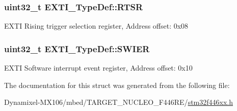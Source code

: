 \subsubsection[{\texorpdfstring{R\+T\+SR}{RTSR}}]{ uint32\+\_\+t E\+X\+T\+I\+\_\+\+Type\+Def\+::\+R\+T\+SR}\hypertarget{struct_e_x_t_i___type_def_ac019d211d8c880b327a1b90a06cc0675}{}\label{struct_e_x_t_i___type_def_ac019d211d8c880b327a1b90a06cc0675}
E\+X\+TI Rising trigger selection register, Address offset\+: 0x08 
\subsubsection[{\texorpdfstring{S\+W\+I\+ER}{SWIER}}]{ uint32\+\_\+t E\+X\+T\+I\+\_\+\+Type\+Def\+::\+S\+W\+I\+ER}\hypertarget{struct_e_x_t_i___type_def_a5c1f538e64ee90918cd158b808f5d4de}{}\label{struct_e_x_t_i___type_def_a5c1f538e64ee90918cd158b808f5d4de}
E\+X\+TI Software interrupt event register, Address offset\+: 0x10 

The documentation for this struct was generated from the following file\+:\begin{DoxyCompactItemize}
\item 
Dynamixel-\/\+M\+X106/mbed/\+T\+A\+R\+G\+E\+T\+\_\+\+N\+U\+C\+L\+E\+O\+\_\+\+F446\+R\+E/\hyperlink{stm32f446xx_8h}{stm32f446xx.\+h}\end{DoxyCompactItemize}
